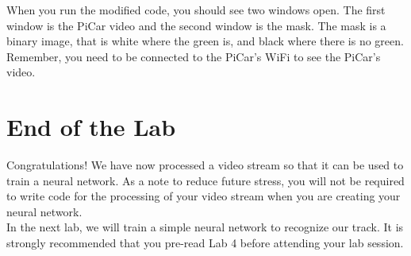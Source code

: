 \documentclass[11pt]{report}
\begin{document}
When you run the modified code, you should see two windows open. The first window is the PiCar video and the second window is the mask. The mask is a binary image, that is white where the green is, and black where there is no green. Remember, you need to be connected to the PiCar's WiFi to see the PiCar's video.


\chapter{End of the Lab}
Congratulations! We have now processed a video stream so that it can be used to train a neural network. As a note to reduce future stress, you will not be required to write code for the processing of your video stream when you are creating your neural network. 
\\
In the next lab, we will train a simple neural network to recognize our track. It is strongly recommended that you pre-read Lab 4 before attending your lab session.
\end{document}
